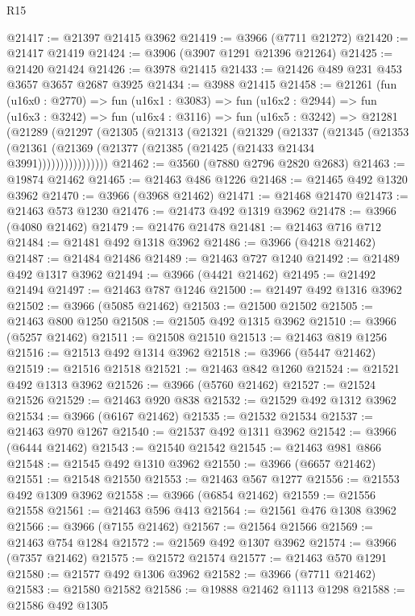\begin{lexlean}{R15}
\begin{coremodule}
@21417 := @21397 @21415 @3962
@21419 := @3966 (@7711 @21272)
@21420 := @21417 @21419
@21424 := @3906 (@3907 @1291 @21396 @21264)
@21425 := @21420 @21424
@21426 := @3978 @21415
@21433 := @21426 @489 @231 @453 @3657 @3657 @2687 @3925
@21434 := @3988 @21415
@21458 := @21261
    (fun (u16x0 : @2770) =>
    fun (u16x1 : @3083) =>
    fun (u16x2 : @2944) =>
    fun (u16x3 : @3242) =>
    fun (u16x4 : @3116) =>
    fun (u16x5 : @3242) =>
    @21281
      (@21289
        (@21297
          (@21305
            (@21313
              (@21321
                (@21329
                  (@21337
                    (@21345
                      (@21353
                        (@21361 (@21369 (@21377 (@21385 (@21425 (@21433 @21434 @3991))))))))))))))))
@21462 := @3560 (@7880 @2796 @2820 @2683)
@21463 := @19874 @21462
@21465 := @21463 @486 @1226
@21468 := @21465 @492 @1320 @3962
@21470 := @3966 (@3968 @21462)
@21471 := @21468 @21470
@21473 := @21463 @573 @1230
@21476 := @21473 @492 @1319 @3962
@21478 := @3966 (@4080 @21462)
@21479 := @21476 @21478
@21481 := @21463 @716 @712
@21484 := @21481 @492 @1318 @3962
@21486 := @3966 (@4218 @21462)
@21487 := @21484 @21486
@21489 := @21463 @727 @1240
@21492 := @21489 @492 @1317 @3962
@21494 := @3966 (@4421 @21462)
@21495 := @21492 @21494
@21497 := @21463 @787 @1246
@21500 := @21497 @492 @1316 @3962
@21502 := @3966 (@5085 @21462)
@21503 := @21500 @21502
@21505 := @21463 @800 @1250
@21508 := @21505 @492 @1315 @3962
@21510 := @3966 (@5257 @21462)
@21511 := @21508 @21510
@21513 := @21463 @819 @1256
@21516 := @21513 @492 @1314 @3962
@21518 := @3966 (@5447 @21462)
@21519 := @21516 @21518
@21521 := @21463 @842 @1260
@21524 := @21521 @492 @1313 @3962
@21526 := @3966 (@5760 @21462)
@21527 := @21524 @21526
@21529 := @21463 @920 @838
@21532 := @21529 @492 @1312 @3962
@21534 := @3966 (@6167 @21462)
@21535 := @21532 @21534
@21537 := @21463 @970 @1267
@21540 := @21537 @492 @1311 @3962
@21542 := @3966 (@6444 @21462)
@21543 := @21540 @21542
@21545 := @21463 @981 @866
@21548 := @21545 @492 @1310 @3962
@21550 := @3966 (@6657 @21462)
@21551 := @21548 @21550
@21553 := @21463 @567 @1277
@21556 := @21553 @492 @1309 @3962
@21558 := @3966 (@6854 @21462)
@21559 := @21556 @21558
@21561 := @21463 @596 @413
@21564 := @21561 @476 @1308 @3962
@21566 := @3966 (@7155 @21462)
@21567 := @21564 @21566
@21569 := @21463 @754 @1284
@21572 := @21569 @492 @1307 @3962
@21574 := @3966 (@7357 @21462)
@21575 := @21572 @21574
@21577 := @21463 @570 @1291
@21580 := @21577 @492 @1306 @3962
@21582 := @3966 (@7711 @21462)
@21583 := @21580 @21582
@21586 := @19888 @21462 @1113 @1298
@21588 := @21586 @492 @1305

\end{coremodule}
\end{lexlean}
